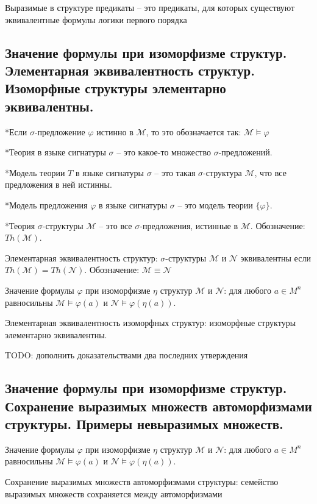 \documentclass[a4paper, 10pt]{article}
\newcommand{\MM}{\mathcal{M}}
\newcommand{\NN}{\mathcal{N}}
\begin{document}
Выразимые в структуре предикаты -- это предикаты, для которых существуют эквивалентные формулы логики первого порядка

\subsection{Значение формулы при изоморфизме структур. Элементарная эквивалентность структур. Изоморфные структуры элементарно эквивалентны.}

*Если $\sigma$-предложение $\varphi$ истинно в $\MM$, то это обозначается так: $\MM\models\varphi$

*Теория в языке сигнатуры $\sigma$ -- это какое-то множество $\sigma$-предложений.

*Модель теории $T$ в языке сигнатуры $\sigma$ -- это такая $\sigma$-структура $\MM$, что все предложения в ней истинны.

*Модель предложения $\varphi$ в языке сигнатуры $\sigma$ -- это модель теории $\{\varphi\}$.

*Теория $\sigma$-структуры $\MM$ -- это все $\sigma$-предложения, истинные в $\MM$. Обозначение: $Th(\MM)$.

\hfill

Элементарная эквивалентность структур: $\sigma$-структуры $\MM$ и $\NN$ эквивалентны если $Th(\MM)=Th(\NN)$. Обозначение: $\MM\equiv\NN$

\hfill

Значение формулы $\varphi$ при изоморфизме $\eta$ структур $\MM$ и $\NN$: для любого $a \in M^n$ равносильны $\MM \models \varphi(a)$ и $\NN \models \varphi(\eta(a))$.

Элементарная эквивалентность изоморфных структур: изоморфные структуры элементарно эквивалентны.

TODO: дополнить доказательствами два последних утверждения

\subsection{Значение формулы при изоморфизме структур. Сохранение выразимых множеств автоморфизмами структуры. Примеры невыразимых множеств.}

Значение формулы $\varphi$ при изоморфизме $\eta$ структур $\MM$ и $\NN$: для любого $a \in M^n$ равносильны $\MM \models \varphi(a)$ и $\NN \models \varphi(\eta(a))$.

Сохранение выразимых множеств автоморфизмами структуры: семейство выразимых множеств сохраняется между автоморфизмами
\end{document}

